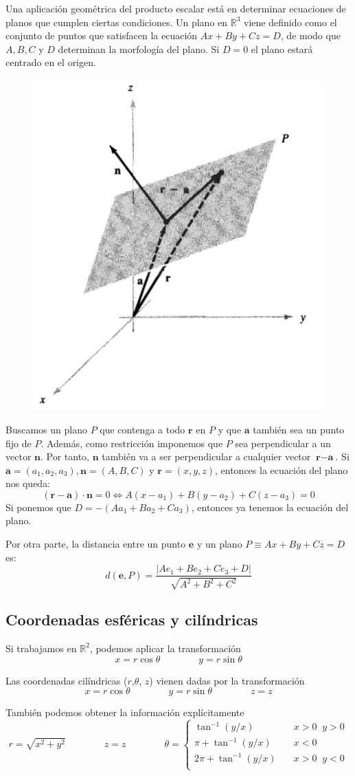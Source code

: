 \documentclass[a4paper]{article}
\begin{document}
Una aplicación geométrica del producto escalar está en determinar ecuaciones de planos que cumplen ciertas condiciones. Un plano en $\mathbb{R}^3$ viene definido como el conjunto de puntos que satisfacen la ecuación $Ax+By+Cz=D$, de modo que $A, B, C $ y $D$ determinan la morfología del plano. Si $D=0$ el plano estará centrado en el origen.

\begin{figure}
		\includegraphics[width=0.35\linewidth]{./imagenes/ran.PNG}
\end{figure}

Buscamos un plano $P$ que contenga a todo $\textbf{r}$ en $P$ y que $\textbf{a}$ también sea un punto fijo de $P$. Además, como restricción imponemos que $P$ sea perpendicular a un vector $\textbf{n}$. Por tanto, $\textbf{n}$ también va a ser perpendicular a cualquier vector $\textbf{r}-\textbf{a}$. Si $\textbf{a} = (a_1, a_2, a_3), \textbf{n} = (A, B, C)$ y $\textbf{r}=(x,y,z)$, entonces la ecuación del plano nos queda: \[(\textbf{r}-\textbf{a})\cdot\textbf{n} = 0 \iff A(x-a_1)+B(y-a_2)+C(z-a_3)=0\]
Si ponemos que $D = -(Aa_1+Ba_2+Ca_3)$, entonces ya tenemos la ecuación del plano.

Por otra parte, la distancia entre un punto $\textbf{e}$ y un plano $P\equiv Ax+By+Cz=D$ es:
\[ d(\textbf{e}, P) = \frac{|Ae_1+Be_2+Ce_3+D|}{\sqrt{A^2+B^2+C^2}} \]

\subsection{Coordenadas esféricas y cilíndricas}

Si trabajamos en $\mathbb{R}^2$, podemos aplicar la transformación
\[ x = r\cos\theta \qquad \qquad y = r \sin\theta \]

Las coordenadas cilíndricas ($r$,$\theta$, $z$) vienen dadas por la transformación
\[ x = r\cos\theta \qquad \qquad y = r \sin\theta \qquad\qquad z= z \]

También podemos obtener la información explícitamente
\[ r = \sqrt{x^2+y^2} \qquad \qquad z = z \qquad\qquad \theta = \begin{cases}
\tan^{-1} (y/x) &\quad x > 0 \;\;y>0\\
\pi + \tan^{-1} (y/x) &\quad x < 0 \\
2\pi + \tan^{-1} (y/x) &\quad x > 0 \;\;y<0\\
\end{cases} \]
\end{document}
